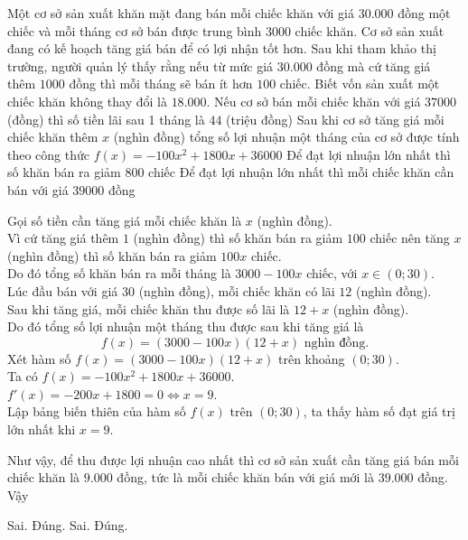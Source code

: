 \begin{ex}%
	Một cơ sở sản xuất khăn mặt đang bán mỗi chiếc khăn với giá $30{.}000$ đồng một chiếc và mỗi tháng cơ sở bán được trung bình $3000$ chiếc khăn. Cơ sở sản xuất đang có kế hoạch tăng giá bán để có lợi nhận tốt hơn. Sau khi tham khảo thị trường, người quản lý thấy rằng nếu từ mức giá $30{.}000$ đồng mà cứ tăng giá
	thêm $1000$ đồng thì mỗi tháng sẽ bán ít hơn $100$ chiếc. Biết vốn sản xuất một chiếc khăn không thay đổi là $18{.}000$.
	\choiceTF
	{Nếu cơ sở bán mỗi chiếc khăn với giá $37000$ (đồng) thì số tiền lãi sau 1 tháng là $44$ (triệu đồng)}
	{\True Sau khi cơ sở tăng giá mỗi chiếc khăn thêm $x$ (nghìn đồng) tổng số lợi nhuận một tháng của cơ sở được tính theo công thức $f(x)=-100x^2+1800x+36000$}
	{Để đạt lợi nhuận lớn nhất thì số khăn bán ra giảm $800$ chiếc}
	{\True Để đạt lợi nhuận lớn nhất thì mỗi chiếc khăn cần bán với giá $39000$ đồng}
	\loigiai
	{
		Gọi số tiền cần tăng giá mỗi chiếc khăn là $x$ (nghìn đồng).\\
		Vì cứ tăng giá thêm $1$ (nghìn đồng) thì số khăn bán ra giảm $100$ chiếc nên tăng $x$ (nghìn đồng) thì số khăn bán ra giảm $100x$ chiếc.\\
		Do đó tổng số khăn bán ra mỗi tháng là $3000-100x$ chiếc, với $x\in (0;30)$.\\
		Lúc đầu bán với giá $30$ (nghìn đồng), mỗi chiếc khăn có lãi $12$ (nghìn đồng).\\
		Sau khi tăng giá, mỗi chiếc khăn thu được số lãi là $12+x$ (nghìn đồng).\\
		Do đó tổng số lợi nhuận một tháng thu được sau khi tăng giá là
		\[f(x)=(3000-100x)(12+x)\,\,\text{nghìn đồng}.\]
		Xét hàm số $f(x)=(3000-100x)(12+x)$ trên khoảng $(0;30)$.\\
		Ta có $f(x)=-100x^2+1800x+36000$.\\
		$f'(x)=-200x+1800=0\Leftrightarrow x=9$.\\
		Lập bảng biến thiên của hàm số $f(x)$ trên $(0;30)$, ta thấy hàm số đạt giá trị lớn nhất khi $x=9$.
		\begin{center}
		\end{center}
		Như vậy, để thu được lợi nhuận cao nhất thì cơ sở sản xuất cần tăng giá bán mỗi chiếc khăn là $9{.}000$ đồng, tức là mỗi chiếc khăn bán với giá mới là $39{.}000$ đồng.\\
		Vậy
		\begin{itemchoice}
			\itemch Sai.
			\itemch Đúng.
			\itemch Sai.
			\itemch Đúng.
		\end{itemchoice}
	}
\end{ex}

